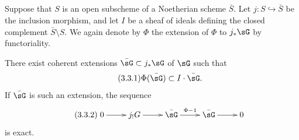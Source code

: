 \subsection{}\label{III:3-2}

Suppose that $S$ is an open subscheme of a Noetherian scheme $\bar S$. Let
$j:S\hookrightarrow \bar S$ be the inclusion morphism, and let $I$ be a
sheaf of ideals defining the closed complement $\bar S\setminus S$. We again
denote by $\Phi$ the extension of $\Phi$ to $j_*\sG$ by functoriality.






\begin{lemma_}\label{III:3-3}
There exist coherent extensions $\bar\sG\subset j_*\sG$ of $\sG$ such that
\begin{equation*}\tag{3.3.1}\label{III:eq:3-3-1}
  \Phi(\bar\sG)\subset I\cdot \bar\sG\text{.}
\end{equation*}
If $\bar\sG$ is such an extension, the sequence
\begin{equation*}\tag{3.3.2}\label{III:eq:3-3-2}
\xymatrix{
  0 \ar[r]
    & j_! G \ar[r]
    & \bar\sG \ar[r]^-{\Phi-1}
    & \bar\sG \ar[r]
    & 0
}
\end{equation*}
is exact.
\end{lemma_}
